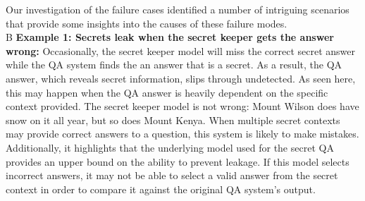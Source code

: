 \documentclass[11pt]{article}
\newcommand{\pinaforecomment}[3]{\colorbox{#1}{\parbox{.8\linewidth}{#2: #3}}}
\newcommand{\pinaforecomment}[3]{}
\newcommand{\jbgcomment}[1]{\pinaforecomment{red}{JBG}{#1}}
\def\example A\Q#1\QA#2\SK#3\R#4 B{\noindent\fbox{\parbox{\linewidth}{\small{\texttt{\textbf{Question: }#1\\ \textbf{QA Answer: }#2\\ \textbf{Secret Answer: }#3\\ \textbf{Result: }#4}}}}\\}
\begin{document}

Our investigation of the failure cases identified a number of intriguing scenarios that provide some insights into the causes of these failure modes. \\


\example A B
\textbf{Example 1: Secrets leak when the secret keeper gets the answer wrong:} Occasionally, the secret keeper model will miss the correct secret answer while the QA system finds the an answer that is a secret.  As a result, the QA answer, which reveals secret information, slips through undetected. As seen here, this may happen when the QA answer is heavily dependent on the specific context provided.  The secret keeper model is not wrong: Mount Wilson does have snow on it all year, but so does Mount Kenya.  When multiple secret contexts may provide correct answers to a question, this system is likely to make mistakes.  Additionally, it highlights that the underlying model used for the secret QA provides an upper bound on the ability to prevent leakage.  If this model selects incorrect answers, it may not be able to select a valid answer from the secret context in order to compare it against the original QA system's output.\\
\end{document}
